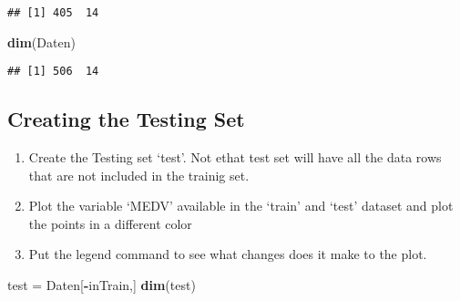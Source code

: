 \documentclass[
]{article}
\newenvironment{Shaded}{\begin{snugshade}}{\end{snugshade}}
\newcommand{\AttributeTok}[1]{\textcolor[rgb]{0.13,0.29,0.53}{#1}}
\newcommand{\CommentTok}[1]{\textcolor[rgb]{0.56,0.35,0.01}{\textit{#1}}}
\newcommand{\ConstantTok}[1]{\textcolor[rgb]{0.56,0.35,0.01}{#1}}
\newcommand{\FloatTok}[1]{\textcolor[rgb]{0.00,0.00,0.81}{#1}}
\newcommand{\FunctionTok}[1]{\textcolor[rgb]{0.13,0.29,0.53}{\textbf{#1}}}
\newcommand{\NormalTok}[1]{#1}
\newcommand{\OtherTok}[1]{\textcolor[rgb]{0.56,0.35,0.01}{#1}}
\newcommand{\SpecialCharTok}[1]{\textcolor[rgb]{0.81,0.36,0.00}{\textbf{#1}}}
\begin{document}
\begin{Shaded}
\end{Shaded}

\begin{verbatim}
## [1] 405  14
\end{verbatim}

\begin{Shaded}
\begin{Highlighting}[]
  \FunctionTok{dim}\NormalTok{(Daten)}
\end{Highlighting}
\end{Shaded}

\begin{verbatim}
## [1] 506  14
\end{verbatim}

\hypertarget{creating-the-testing-set}{%
\subsection{Creating the Testing Set}\label{creating-the-testing-set}}

\begin{enumerate}
\def\labelenumi{\arabic{enumi})}
\item
  Create the Testing set `test'. Not ethat test set will have all the
  data rows that are not included in the trainig set.
\item
  Plot the variable `MEDV' available in the `train' and `test' dataset
  and plot the points in a different color
\item
  Put the legend command to see what changes does it make to the plot.
\end{enumerate}

\begin{Shaded}
\begin{Highlighting}[]
\NormalTok{  test }\OtherTok{=}\NormalTok{ Daten[}\SpecialCharTok{{-}}\NormalTok{inTrain,]}
  \FunctionTok{dim}\NormalTok{(test)}
\end{Highlighting}
\end{Shaded}
\end{document}
